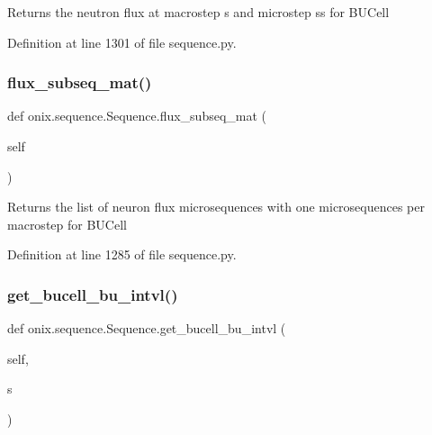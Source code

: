 \begin{DoxyVerb}Returns the neutron flux at macrostep s and microstep ss for BUCell\end{DoxyVerb}
 

Definition at line 1301 of file sequence.\+py.

\mbox{\label{classonix_1_1sequence_1_1Sequence_a7bdc99d34fa79fec10d979a972138ffa}} 
\subsubsection{\texorpdfstring{flux\+\_\+subseq\+\_\+mat()}{flux\_subseq\_mat()}}
{\footnotesize\ttfamily def onix.\+sequence.\+Sequence.\+flux\+\_\+subseq\+\_\+mat (\begin{DoxyParamCaption}\item[{}]{self }\end{DoxyParamCaption})}

\begin{DoxyVerb}Returns the list of neuron flux microsequences with one microsequences per macrostep
for BUCell\end{DoxyVerb}
 

Definition at line 1285 of file sequence.\+py.

\mbox{\label{classonix_1_1sequence_1_1Sequence_a63956192d96130aa044ae707fbb03b40}} 
\subsubsection{\texorpdfstring{get\+\_\+bucell\+\_\+bu\+\_\+intvl()}{get\_bucell\_bu\_intvl()}}
{\footnotesize\ttfamily def onix.\+sequence.\+Sequence.\+get\+\_\+bucell\+\_\+bu\+\_\+intvl (\begin{DoxyParamCaption}\item[{}]{self,  }\item[{}]{s }\end{DoxyParamCaption})}

